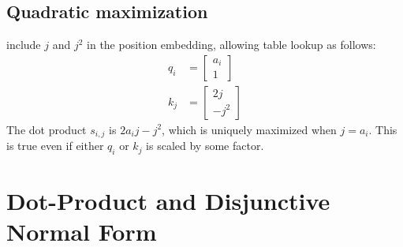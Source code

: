 \subsection{Quadratic maximization}

 include $j$ and $j^2$ in the position embedding, allowing table lookup as follows:
\begin{align*}
  q_i &= \begin{bmatrix} a_i \\ 1 \end{bmatrix} \\
  k_j &= \begin{bmatrix} 2j \\ -j^2 \end{bmatrix}
\end{align*}
The dot product $s_{i,j}$ is $2a_ij - j^2$, which is uniquely maximized when $j=a_i$.
This is true even if either $q_i$ or $k_j$ is scaled by some factor.

\iffalse
\subsection{$-|\text{Dot-product}|$ attention}

\citep{perez-etal-2021-turing}
\fi

\section{Dot-Product and Disjunctive Normal Form}
\label{sec:att_dnf}

